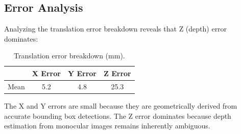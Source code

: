 \subsection{Error Analysis}

Analyzing the translation error breakdown reveals that Z (depth) error dominates:

\begin{table}[h]
\centering
\caption{Translation error breakdown (mm).}
\label{tab:error_breakdown}
\begin{tabular}{lccc}
\toprule
 & X Error & Y Error & Z Error \\
\midrule
Mean & 5.2 & 4.8 & 25.3 \\
\bottomrule
\end{tabular}
\end{table}

The X and Y errors are small because they are geometrically derived from accurate bounding box detections. The Z error dominates because depth estimation from monocular images remains inherently ambiguous.
